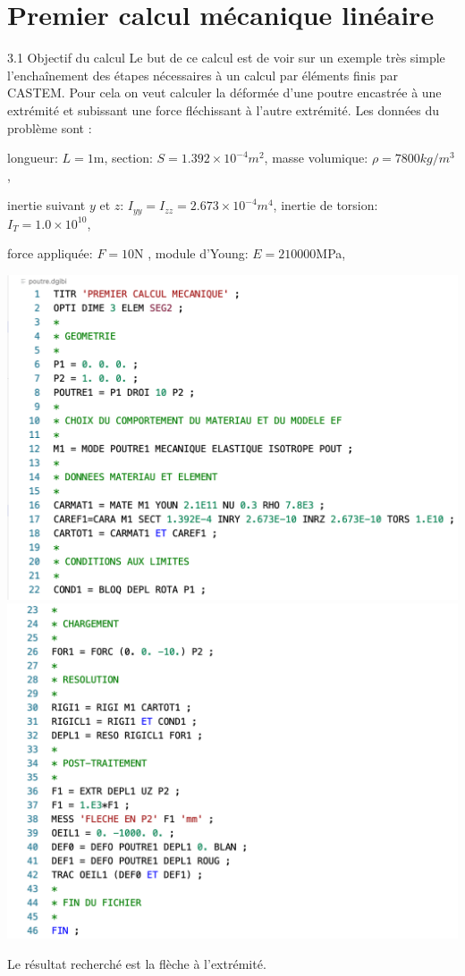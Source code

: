 \documentclass[a4paper,multicol]{article}
\begin{document}
\begin{multicols}{2}
\end{multicols}


\section*{Premier calcul mécanique linéaire}
3.1 Objectif du calcul
Le but de ce calcul est de voir sur un exemple très simple l'enchaînement des étapes nécessaires à un calcul par éléments finis par CASTEM. Pour cela on veut calculer la déformée d'une poutre encastrée à une extrémité et subissant une force fléchissant à l'autre extrémité.
Les données du problème sont :

longueur: $L=1$m, section: $ S = 1.392\times 10^{-4} m^2$, masse volumique: $\rho=7800kg/m^3$, 

inertie suivant $y$ et $z$: $I_{yy} = I_{zz} =  2.673\times 10^{-4} m^4$,
inertie de torsion:  $I_T = 1.0\times 10^{10}$, 

force appliquée: $F = 10$N , module d'Young: $E = 210000$MPa, 

\begin{multicols}{2}
\includegraphics[scale=0.21]{poutre11.png} 
\includegraphics[scale=0.21]{poutre12.png} 
\end{multicols}
Le résultat recherché est la flèche à l'extrémité.
\end{document}
